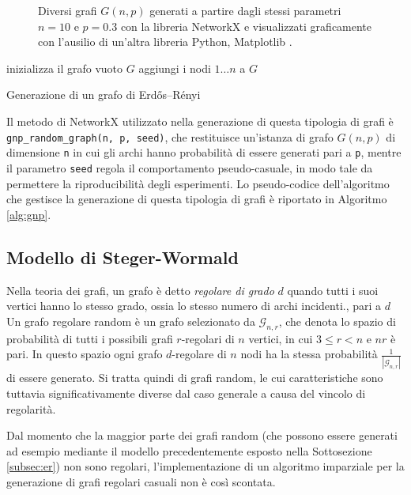 \begin{figure}[h!]
\begin{subfigure}[b]{0.29\textwidth}
     \end{subfigure}
        \caption{Diversi grafi $G(n,p)$ generati a partire dagli stessi parametri $n=10$ e $p=0.3$ con la libreria NetworkX e visualizzati graficamente con l'ausilio di un'altra libreria Python, Matplotlib \cite{Hunter2007}.}
        \label{fig:gnpes}
\end{figure}

\begin{algorithm}
\SetAlgoLined
{}
 inizializza il grafo vuoto $G$\;
 aggiungi i nodi $1 \dots n$ a $G$\;
 \caption{Generazione di un grafo di Erdős–Rényi}
 \label{alg:gnp}
\end{algorithm}

Il metodo di NetworkX utilizzato nella generazione di questa tipologia di grafi è \linebreak
\texttt{gnp\_random\_graph(n, p, seed)}, che restituisce un'istanza di grafo $G(n,p)$ di dimensione \texttt{n} in cui gli archi hanno probabilità di essere generati pari a \texttt{p}, mentre il parametro \texttt{seed} regola il comportamento pseudo-casuale, in modo tale da permettere la riproducibilità degli esperimenti. Lo pseudo-codice dell'algoritmo che gestisce la generazione di questa tipologia di grafi è riportato in Algoritmo \ref{alg:gnp}.

\subsection{Modello di Steger-Wormald}
Nella teoria dei grafi, un grafo è detto \textit{regolare di grado} $d$ quando tutti i suoi vertici hanno lo stesso grado, ossia lo stesso numero di archi incidenti., pari a $d$ Un grafo regolare random è un grafo selezionato da $\mathcal{G}_{n,r}$, che denota lo spazio di probabilità di tutti i possibili grafi $r$-regolari di $n$ vertici, in cui $3\leq r < n$ e $nr$ è pari. In questo spazio ogni grafo $d$-regolare di $n$ nodi ha la stessa probabilità $\frac{1}{|\mathcal{G}_{n,r}|}$ di essere generato. Si tratta quindi di grafi random, le cui caratteristiche sono tuttavia significativamente diverse dal caso generale a causa del vincolo di regolarità.

Dal momento che la maggior parte dei grafi random (che possono essere generati ad esempio mediante il modello precedentemente esposto nella Sottosezione \ref{subsec:er}) non sono regolari, l'implementazione di un algoritmo imparziale per la generazione di grafi regolari casuali non è così scontata. 

